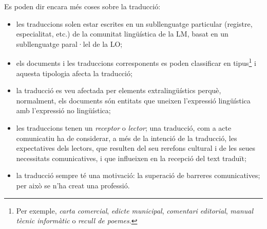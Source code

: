 Es poden dir encara més coses sobre la traducció:
\begin{itemize}
\item les traduccions solen estar escrites en un subllenguatge
  particular (registre, especialitat, etc.) de la comunitat
  lingüística de la LM, basat en un subllenguatge paral·lel de la LO;
\item els documents i les traduccions corresponents es poden
  classificar en tipus\footnote{Per exemple, \emph{carta comercial},
    \emph{edicte municipal}, \emph{comentari editorial}, \emph{manual
      tècnic informàtic} o \emph{recull de poemes}. } i aquesta
  tipologia afecta la traducció;
\item la traducció es veu afectada per elements extralingüístics
  perquè, normalment, els documents són entitats que uneixen
  l'expressió lingüística amb l'expressió no lingüística;
\item les traduccions tenen un \emph{receptor} o \emph{lector}; una
  traducció, com a acte comunicatiu ha de considerar, a més de la
  intenció de la traducció, les expectatives dels lectors, que
  resulten del seu rerefons cultural i de les seues necessitats
  comunicatives, i que influeixen en la recepció del text traduït;
\item la traducció sempre té una motivació: la superació de barreres
  comunicatives; per això se n'ha creat una professió.
\end{itemize}

